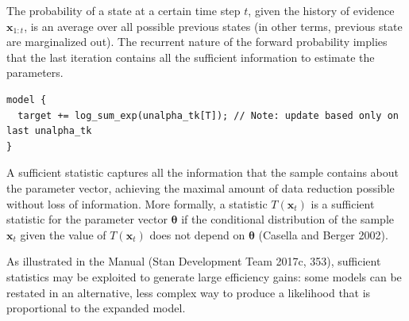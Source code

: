 \documentclass[]{article}
\newcommand{\mat}[1]{\mathbf{#1}}
\begin{document}
The probability of a state at a certain time step \(t\), given the
history of evidence \(\mat{x}_{1:t}\), is an average over all possible
previous states (in other terms, previous state are marginalized out).
The recurrent nature of the forward probability implies that the last
iteration contains all the sufficient information to estimate the
parameters.

\begin{verbatim}
model {
  target += log_sum_exp(unalpha_tk[T]); // Note: update based only on last unalpha_tk
}
\end{verbatim}

A sufficient statistic captures all the information that the sample
contains about the parameter vector, achieving the maximal amount of
data reduction possible without loss of information. More formally, a
statistic \(T(\mat{x}_t)\) is a sufficient statistic for the parameter
vector \(\mat{\theta}\) if the conditional distribution of the sample
\(\mat{x}_t\) given the value of \(T(\mat{x}_t)\) does not depend on
\(\mat{\theta}\) (Casella and Berger 2002).

As illustrated in the Manual (Stan Development Team 2017c, 353),
sufficient statistics may be exploited to generate large efficiency
gains: some models can be restated in an alternative, less complex way
to produce a likelihood that is proportional to the expanded model.
\end{document}
